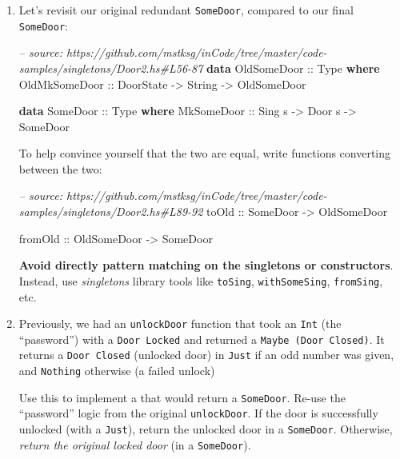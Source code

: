 \documentclass[]{article}
\newenvironment{Shaded}{}{}
\newcommand{\KeywordTok}[1]{\textcolor[rgb]{0.00,0.44,0.13}{\textbf{#1}}}
\newcommand{\DataTypeTok}[1]{\textcolor[rgb]{0.56,0.13,0.00}{#1}}
\newcommand{\CommentTok}[1]{\textcolor[rgb]{0.38,0.63,0.69}{\textit{#1}}}
\newcommand{\OtherTok}[1]{\textcolor[rgb]{0.00,0.44,0.13}{#1}}
\newcommand{\NormalTok}[1]{#1}
\begin{document}
\begin{enumerate}
\def\labelenumi{\arabic{enumi}.}
\item
  Let's revisit our original redundant \texttt{SomeDoor}, compared to our final
  \texttt{SomeDoor}:

\begin{Shaded}
\begin{Highlighting}[]
\CommentTok{-- source: https://github.com/mstksg/inCode/tree/master/code-samples/singletons/Door2.hs#L56-87}
\KeywordTok{data} \DataTypeTok{OldSomeDoor}\OtherTok{ ::} \DataTypeTok{Type} \KeywordTok{where}
    \DataTypeTok{OldMkSomeDoor}\OtherTok{ ::} \DataTypeTok{DoorState} \OtherTok{->} \DataTypeTok{String} \OtherTok{->} \DataTypeTok{OldSomeDoor}

\KeywordTok{data} \DataTypeTok{SomeDoor}\OtherTok{ ::} \DataTypeTok{Type} \KeywordTok{where}
    \DataTypeTok{MkSomeDoor}\OtherTok{ ::} \DataTypeTok{Sing}\NormalTok{ s }\OtherTok{->} \DataTypeTok{Door}\NormalTok{ s }\OtherTok{->} \DataTypeTok{SomeDoor}
\end{Highlighting}
\end{Shaded}

  To help convince yourself that the two are equal, write functions converting
  between the two:

\begin{Shaded}
\begin{Highlighting}[]
\CommentTok{-- source: https://github.com/mstksg/inCode/tree/master/code-samples/singletons/Door2.hs#L89-92}
\OtherTok{toOld ::} \DataTypeTok{SomeDoor} \OtherTok{->} \DataTypeTok{OldSomeDoor}

\OtherTok{fromOld ::} \DataTypeTok{OldSomeDoor} \OtherTok{->} \DataTypeTok{SomeDoor}
\end{Highlighting}
\end{Shaded}

  \textbf{Avoid directly pattern matching on the singletons or constructors}.
  Instead, use \emph{singletons} library tools like \texttt{toSing},
  \texttt{withSomeSing}, \texttt{fromSing}, etc.
\item
  Previously, we had an \texttt{unlockDoor} function that took an \texttt{Int}
  (the ``password'') with a \texttt{Door\ \textquotesingle{}Locked} and returned
  a \texttt{Maybe\ (Door\ \textquotesingle{}Closed)}. It returns a
  \texttt{Door\ \textquotesingle{}Closed} (unlocked door) in \texttt{Just} if an
  odd number was given, and \texttt{Nothing} otherwise (a failed unlock)

  Use this to implement a that would return a \texttt{SomeDoor}. Re-use the
  ``password'' logic from the original \texttt{unlockDoor}. If the door is
  successfully unlocked (with a \texttt{Just}), return the unlocked door in a
  \texttt{SomeDoor}. Otherwise, \emph{return the original locked door} (in a
  \texttt{SomeDoor}).


\end{enumerate}
\end{document}
